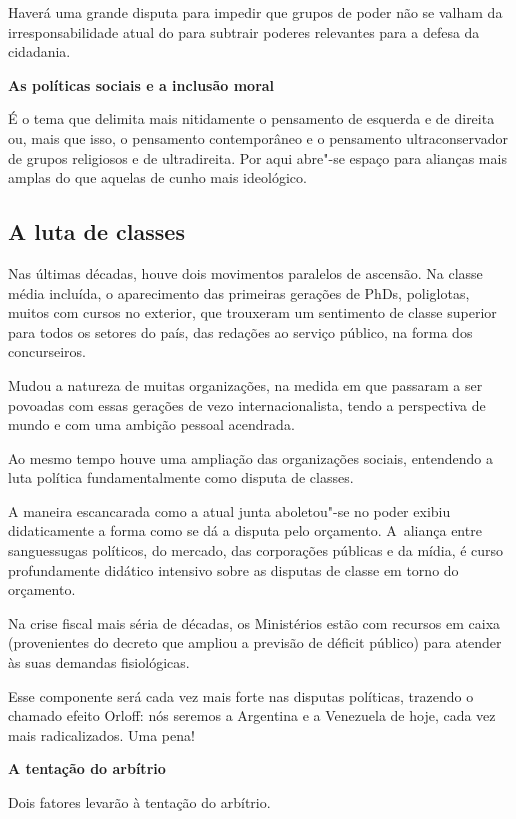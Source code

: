 Haverá uma grande disputa para impedir que grupos de poder não se valham
da irresponsabilidade atual do  para subtrair poderes relevantes para
a defesa da cidadania.

\textbf{As políticas sociais e a inclusão moral}

É o tema que delimita mais nitidamente o pensamento de esquerda e de
direita ou, mais que isso, o pensamento contemporâneo e o pensamento
ultraconservador de grupos religiosos e de ultradireita. Por aqui
abre"-se espaço para alianças mais amplas do que aquelas de cunho mais
ideológico.

\subsection{A luta de classes}

Nas últimas décadas, houve dois movimentos paralelos de ascensão. Na
classe média incluída, o aparecimento das primeiras gerações de PhDs,
poliglotas, muitos com cursos no exterior, que trouxeram um sentimento
de classe superior para todos os setores do país, das redações ao
serviço público, na forma dos concurseiros.

Mudou a natureza de muitas organizações, na medida em que passaram a ser
povoadas com essas gerações de vezo internacionalista, tendo a
perspectiva de mundo e com uma ambição pessoal acendrada.

Ao mesmo tempo houve uma ampliação das organizações sociais, entendendo
a luta política fundamentalmente como disputa de classes.

A maneira escancarada como a atual junta aboletou"-se no poder exibiu
didaticamente a forma como se dá a disputa pelo orçamento. A~aliança
entre sanguessugas políticos, do mercado, das corporações públicas e da
mídia, é curso profundamente didático intensivo sobre as disputas de
classe em torno do orçamento.

Na crise fiscal mais séria de décadas, os Ministérios estão com recursos
em caixa (provenientes do decreto que ampliou a previsão de déficit
público) para atender às suas demandas fisiológicas.

Esse componente será cada vez mais forte nas disputas políticas,
trazendo o chamado efeito Orloff: nós seremos a Argentina e a Venezuela
de hoje, cada vez mais radicalizados. Uma pena!

\textbf{A tentação do arbítrio}

Dois fatores levarão à tentação do arbítrio.

